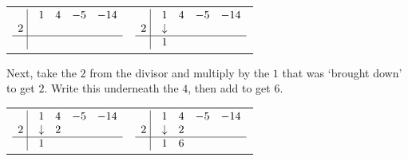 \bigskip

\begin{center}

\begin{tabular}{cc}

$ \begin{array}{rrrrr}


   \, \, \vline& 1 & 4 & -5  & -14 \\

2  \, \,  \vline&  &    &    &  \\ \hline
  \vline&   &     &   &    \\  
\end{array}$  \hspace{1in}
&


$ \begin{array}{rrrrr}


   \, \, \vline& 1 & 4 & -5  & -14 \\

 2  \, \, \vline& \downarrow &    &    &  \\ \hline
 \vline & 1  &     &   &    \\  
\end{array}$ \\

\end{tabular}

\end{center}

\bigskip

Next, take the $2$ from the divisor and multiply by the $1$ that was `brought down' to get $2$.  Write this underneath the $4$, then add to get $6$.

\bigskip

\begin{center}

\begin{tabular}{cc}

$ \begin{array}{rrrrr}


   \, \, \vline& 1 & 4 & -5  & -14 \\

   2  \, \, \vline& \downarrow  &  2  &    &  \\ \hline
  \vline& 1  &     &   &    \\  
\end{array}$ \hspace{1in}
&


$ \begin{array}{rrrrr}


   \, \, \vline& 1 & 4 & -5  & -14 \\

   2  \, \, \vline& \downarrow &  2  &    &  \\ \hline
  \vline& 1  &   6  &   &    \\  
\end{array}$ \\


\end{tabular}

\end{center}


